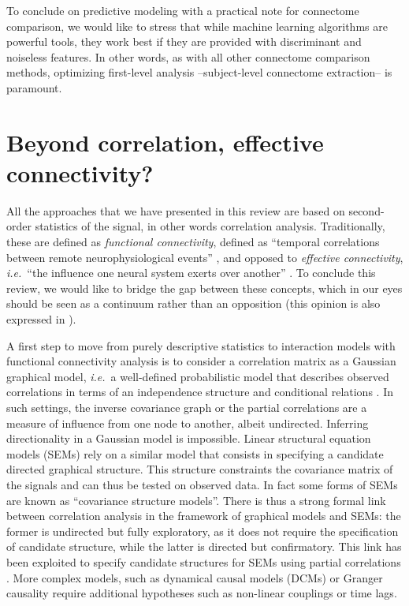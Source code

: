 \documentclass[5p]{elsarticle}
\begin{document}
To conclude on predictive modeling with a practical note for connectome
comparison, we would like to stress that while machine learning
algorithms are powerful tools, they work best if they are provided with
discriminant and noiseless features. In other words, as with all other
connectome comparison methods, optimizing first-level analysis
--subject-level connectome extraction-- is paramount.


\section{Beyond correlation, effective connectivity?}

All the approaches that we have presented in this review are based on
second-order statistics of the signal, in other words correlation
analysis. Traditionally, these are defined as \emph{functional
connectivity}, defined as ``temporal correlations between remote
neurophysiological events'' \cite{friston1994}, and opposed to
\emph{effective connectivity}, \emph{i.e.}\ ``the influence one neural
system exerts over another'' \cite{friston1994}. To conclude this review,
we would like to bridge the gap between these concepts, which in our eyes
should be seen as a continuum rather than an opposition (this opinion is
also expressed in \cite{mcintosh2010}).

A first step to move from purely descriptive statistics to interaction
models with
functional connectivity analysis is to consider a correlation matrix as a
Gaussian graphical model, \emph{i.e.}\ a well-defined probabilistic model
that describes observed correlations in terms of an independence
structure and conditional relations \cite{lauritzen1996,varoquaux2011}.
In such settings, the inverse covariance graph or the partial
correlations are a measure of influence from one node to another, albeit
undirected. Inferring directionality in a Gaussian model is impossible. Linear
structural equation models (SEMs) \cite{mcintosh1994} rely on a similar
model that consists in specifying a candidate directed graphical
structure. This structure constraints the covariance matrix of the
signals and can thus be tested on observed data. In fact some forms of
SEMs are known as ``covariance structure models''. There is thus a strong
formal link between correlation analysis in the framework of graphical
models and SEMs: the former is undirected but fully exploratory, as it
does not require the specification of candidate structure, while the
latter is directed but confirmatory. This link has been exploited to
specify candidate structures for SEMs using partial correlations
\cite{marrelec2007}. More complex models, such as dynamical causal models
(DCMs) \cite{friston2003a} or Granger causality \cite{goebel2003} require
additional hypotheses such as non-linear couplings or time lags.
\end{document}
